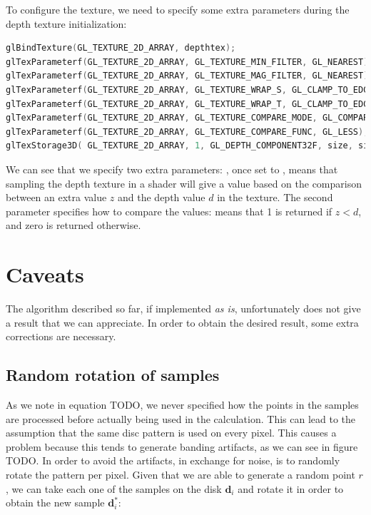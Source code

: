 To configure the  texture, we need to specify some extra parameters during the depth texture initialization:

\begin{lstlisting}[language=C++,label=lst:textureconfshadow,caption={Configuration of a shadow map depth texture.}]
glBindTexture(GL_TEXTURE_2D_ARRAY, depthtex);
glTexParameterf(GL_TEXTURE_2D_ARRAY, GL_TEXTURE_MIN_FILTER, GL_NEAREST);
glTexParameterf(GL_TEXTURE_2D_ARRAY, GL_TEXTURE_MAG_FILTER, GL_NEAREST);
glTexParameterf(GL_TEXTURE_2D_ARRAY, GL_TEXTURE_WRAP_S, GL_CLAMP_TO_EDGE);
glTexParameterf(GL_TEXTURE_2D_ARRAY, GL_TEXTURE_WRAP_T, GL_CLAMP_TO_EDGE);
glTexParameterf(GL_TEXTURE_2D_ARRAY, GL_TEXTURE_COMPARE_MODE, GL_COMPARE_REF_TO_TEXTURE);
glTexParameterf(GL_TEXTURE_2D_ARRAY, GL_TEXTURE_COMPARE_FUNC, GL_LESS);
glTexStorage3D(	GL_TEXTURE_2D_ARRAY, 1, GL_DEPTH_COMPONENT32F, size, size, layers);
\end{lstlisting}

We can see that we specify two extra parameters: , once set to , means that sampling the depth texture in a shader will give a value based on the comparison between an extra value $z$ and the depth value $d$ in the texture. The second parameter  specifies how to compare the values:  means that 1 is returned if $z<d$, and zero is returned otherwise. 

\section{Caveats}
The algorithm described so far, if implemented \emph{as is}, unfortunately does not give a result that we can appreciate. In order to obtain the desired result, some extra corrections are necessary.

\subsection{Random rotation of samples}
As we note in equation TODO, we never specified how the points in the samples are processed before actually being used in the calculation. This can lead to the assumption that the same disc pattern is used on every pixel. This causes a problem because this tends to generate banding artifacts, as we can see in figure TODO. In order to avoid the artifacts, in exchange for noise, is to randomly rotate the pattern per pixel. Given that we are able to generate a random point $r$, we can take each one of the samples on the disk $\mathbf{d}_i$ and rotate it in order to obtain the new sample $\mathbf{d}_i^*$:

